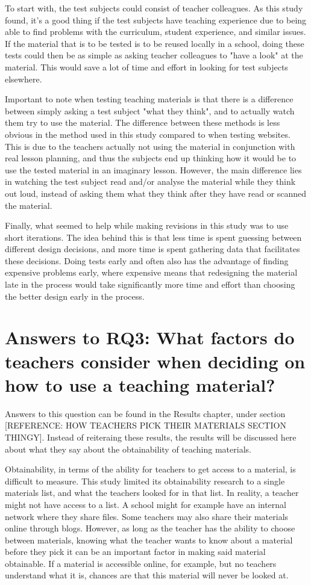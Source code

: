 To start with, the test subjects could consist of teacher colleagues. As this study found, it's a good thing if the test subjects have teaching experience due to being able to find problems with the curriculum, student experience, and similar issues. If the material that is to be tested is to be reused locally in a school, doing these tests could then be as simple as asking teacher colleagues to "have a look" at the material. This would save a lot of time and effort in looking for test subjects elsewhere.

Important to note when testing teaching materials is that there is a difference between simply asking a test subject "what they think", and to actually watch them try to use the material. The difference between these methods is less obvious in the method used in this study compared to when testing websites. This is due to the teachers actually not using the material in conjunction with real lesson planning, and thus the subjects end up thinking how it would be to use the tested material in an imaginary lesson. However, the main difference lies in watching the test subject read and/or analyse the material while they think out loud, instead of asking them what they think after they have read or scanned the material.

Finally, what seemed to help while making revisions in this study was to use short iterations. The idea behind this is that less time is spent guessing between different design decisions, and more time is spent gathering data that facilitates these decisions. Doing tests early and often also has the advantage of finding expensive problems early, where expensive means that redesigning the material late in the process would take significantly more time and effort than choosing the better design early in the process.

\section{Answers to RQ3: What factors do teachers consider when deciding on how to use a teaching material?}

Answers to this question can be found in the Results chapter, under section [REFERENCE: HOW TEACHERS PICK THEIR MATERIALS SECTION THINGY]. Instead of reiteraing these results, the results will be discussed here about what they say about the obtainability of teaching materials.

Obtainability, in terms of the ability for teachers to get access to a material, is difficult to measure. This study limited its obtainability research to a single materials list, and what the teachers looked for in that list. In reality, a teacher might not have access to a list. A school might for example have an internal network where they share files. Some teachers may also share their materials online through blogs. However, as long as the teacher has the ability to choose between materials, knowing what the teacher wants to know about a material before they pick it can be an important factor in making said material obtainable. If a material is accessible online, for example, but no teachers understand what it is, chances are that this material will never be looked at.

